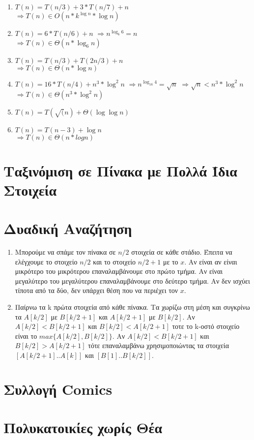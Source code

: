 \documentclass[a4paper,10pt]{article} \usepackage{anysize}
\begin{document}
\begin{enumerate}
\begin{enumerate}
\item $T(n) = T(n/3) +3*T(n/7)+n$\\
$\Rightarrow T(n) \in O(n*k^{\log{n}}*\log{n})$

\item $T(n) = 6*T(n/6)+n$
$\Rightarrow n^{\log _6 {6}} = n$\\
$\Rightarrow T(n) \in \Theta(n*\log _6 {n})$

\item $T(n) = T(n/3) + T(2n/3) + n$\\
$\Rightarrow T(n) \in \Theta(n*\log{n})$

\item $T(n) = 16*T(n/4) + n^3*\log^2{n}$
$\Rightarrow n^{\log _16{4}} = \sqrt{n}$
$\Rightarrow \sqrt{n} < n^3*\log^2{n}$\\
$\Rightarrow T(n) \in \Theta(n^3*\log^2{n})$

\item $T(n) = T(\sqrt(n) + \Theta(\log{\log{n}})$

\item $T(n) = T(n-3) + \log{n}$\\
$\Rightarrow T(n) \in \Theta(n*logn)$

\end{enumerate}
\end{enumerate}

\section{Ταξινόμιση σε Πίνακα με Πολλά Ίδια Στοιχεία}

\section{Δυαδική Αναζήτηση}
\begin{enumerate}
\item Μπορούμε να σπάμε τον πίνακα σε $n/2$ στοιχεία σε κάθε στάδιο. Έπειτα να
ελέγχουμε το στοιχείο $n/2$ και το στοιχείο $n/2+1$ με το $x$. Αν είναι
αν είναι μικρότερο του μικρότερου επαναλαμβάνουμε στο πρώτο τμήμα. Αν είναι
μεγαλύτερο του μεγαλύτερου επαναλαμβάνουμε στο δεύτερο τμήμα. Αν δεν ισχύει
τίποτα από τα δύο, δεν υπάρχει θέση που να περιέχει τον $x$.
\item Παίρνω τα k πρώτα στοιχεία από κάθε πίνακα. Τα χωρίζω στη μέση και
συγκρίνω τα $A[k/2]$ με $B[k/2+1]$ και $A[k/2+1]$ με $B[k/2]$. Αν
$A[k/2]<B[k/2+1]$ και $B[k/2]<A[k/2+1]$ τοτε το k-οστό στοιχείο είναι το
$max\{A[k/2],B[k/2]\}$. Αν $A[k/2]<B[k/2+1]$ και $B[k/2]>A[k/2+1]$ τότε
επαναλαμβάνω χρησιμοποιώντας τα στοιχεία $[A[k/2+1]..A[k]]$ και
$[B[1]..B[k/2]]$.
\end{enumerate}
\section{Συλλογή Comics}
\section{Πολυκατοικίες χωρίς Θέα}
\end{document}
